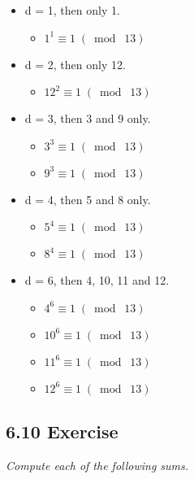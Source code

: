 \documentclass{article}
\begin{document}
\begin{itemize}
    \item d = 1, then only 1.
    \begin{itemize}
        \item $1^1 \equiv 1 \;(\bmod\; 13)$
    \end{itemize}
    \item d = 2, then only 12.
    \begin{itemize}
        \item $12^2 \equiv 1 \;(\bmod\; 13)$
    \end{itemize}
    \item d = 3, then 3 and 9 only.
    \begin{itemize}
        \item $3^3 \equiv 1 \;(\bmod\; 13)$
        \item $9^3 \equiv 1 \;(\bmod\; 13)$
    \end{itemize}
    \item d = 4, then 5 and 8 only.
    \begin{itemize}
        \item $5^4 \equiv 1 \;(\bmod\; 13)$
        \item $8^4 \equiv 1 \;(\bmod\; 13)$
    \end{itemize}
    \item d = 6, then 4, 10, 11 and 12. 
    \begin{itemize}
        \item $4^6 \equiv 1 \;(\bmod\; 13)$
        \item $10^6 \equiv 1 \;(\bmod\; 13)$
        \item $11^6 \equiv 1 \;(\bmod\; 13)$
        \item $12^6 \equiv 1 \;(\bmod\; 13)$
    \end{itemize}
\end{itemize}

\subsection*{6.10 Exercise} 
\quad \textit{Compute each of the following sums.}
\end{document}
